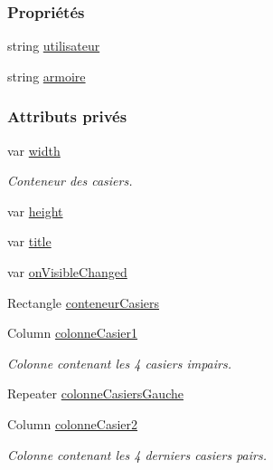 \subsubsection*{Propriétés}
\begin{DoxyCompactItemize}
\item 
string \hyperlink{class_stock_armoire_aae2efdb9b3a81d6c6ec816ba51e27c8d}{utilisateur}
\item 
string \hyperlink{class_stock_armoire_a9bed53c469e3e7e9e870fce7ab2d1e84}{armoire}
\end{DoxyCompactItemize}
\subsubsection*{Attributs privés}
\begin{DoxyCompactItemize}
\item 
var \hyperlink{class_stock_armoire_a9d25f76d65f156f53ad3bc738e15b6a9}{width}
\begin{DoxyCompactList}\small\item\em Conteneur des casiers. \end{DoxyCompactList}\item 
var \hyperlink{class_stock_armoire_a8b31a1368d50c62656ffde269a2d880d}{height}
\item 
var \hyperlink{class_stock_armoire_a09dd833b012f0340be7bcf7135f785dd}{title}
\item 
var \hyperlink{class_stock_armoire_a0c6223c4c36b665251b364eef75b960b}{on\+Visible\+Changed}
\item 
Rectangle \hyperlink{class_stock_armoire_abbd46dd29fe165da0570e6ab052076a6}{conteneur\+Casiers}
\item 
Column \hyperlink{class_stock_armoire_a86c24dd5c6a43d0398faeb150018822b}{colonne\+Casier1}
\begin{DoxyCompactList}\small\item\em Colonne contenant les 4 casiers impairs. \end{DoxyCompactList}\item 
Repeater \hyperlink{class_stock_armoire_ac90ab49066943f1970216f1b3e89e43a}{colonne\+Casiers\+Gauche}
\item 
Column \hyperlink{class_stock_armoire_ab3d122226f114b5191f48b9be3c5747a}{colonne\+Casier2}
\begin{DoxyCompactList}\small\item\em Colonne contenant les 4 derniers casiers pairs. \end{DoxyCompactList}\item 

\end{DoxyCompactItemize}
